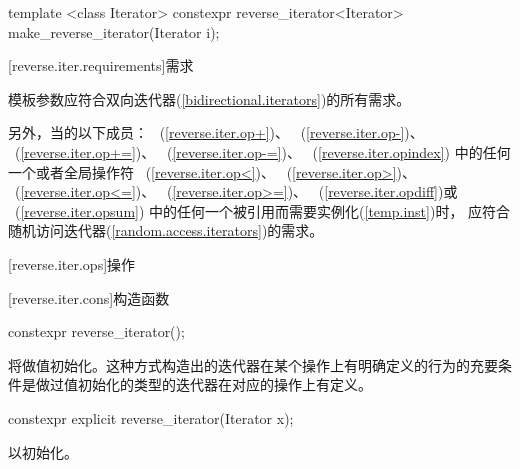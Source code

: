 \begin{codeblock}
{  template <class Iterator>
    constexpr reverse_iterator<Iterator> make_reverse_iterator(Iterator i);      
}
\end{codeblock}

[reverse.iter.requirements]{需求}

\pnum
模板参数应符合双向迭代器(\ref{bidirectional.iterators})的所有需求。

\pnum
另外，当的以下成员：
~(\ref{reverse.iter.op+})、
~(\ref{reverse.iter.op-})、
~(\ref{reverse.iter.op+=})、
~(\ref{reverse.iter.op-=})、
~(\ref{reverse.iter.opindex})
中的任何一个或者全局操作符
~(\ref{reverse.iter.op<})、
~(\ref{reverse.iter.op>})、\\
~(\ref{reverse.iter.op<=})、
~(\ref{reverse.iter.op>=})、
~(\ref{reverse.iter.opdiff})或
~(\ref{reverse.iter.opsum})
中的任何一个被引用而需要实例化(\ref{temp.inst})时，
应符合随机访问迭代器(\ref{random.access.iterators})的需求。

[reverse.iter.ops]{操作}

[reverse.iter.cons]{构造函数}

%
\begin{itemdecl}
constexpr reverse_iterator();
\end{itemdecl}

\begin{itemdescr}
\pnum
\effects
将做值初始化。这种方式构造出的迭代器在某个操作上有明确定义的行为的充要条件是做过值初始化的类型的迭代器在对应的操作上有定义。
\end{itemdescr}

%

\begin{itemdecl}
constexpr explicit reverse_iterator(Iterator x);
\end{itemdecl}

\begin{itemdescr}
\pnum
\effects
以初始化。
\end{itemdescr}

%

